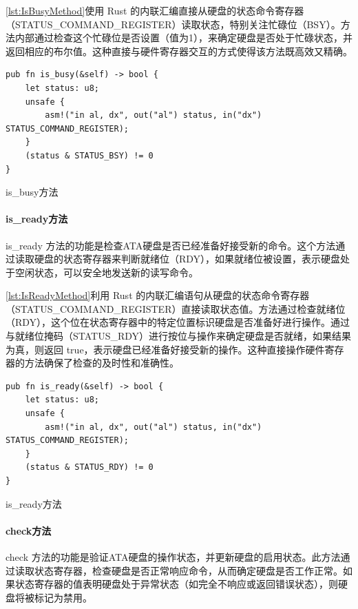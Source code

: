 \cref{lst:IsBusyMethod}使用 Rust 的内联汇编直接从硬盘的状态命令寄存器（STATUS\_COMMAND\_REGISTER）读取状态，特别关注忙碌位（BSY）。方法内部通过检查这个忙碌位是否设置（值为1），来确定硬盘是否处于忙碌状态，并返回相应的布尔值。这种直接与硬件寄存器交互的方式使得该方法既高效又精确。

\begin{listing}[htbp]
    \begin{verbatim}
pub fn is_busy(&self) -> bool {
    let status: u8;
    unsafe {
        asm!("in al, dx", out("al") status, in("dx") STATUS_COMMAND_REGISTER);
    }
    (status & STATUS_BSY) != 0
}
    \end{verbatim}
    \caption{is\_busy方法}\label{lst:IsBusyMethod}
\end{listing}

\paragraph{is\_ready方法}

is\_ready 方法的功能是检查ATA硬盘是否已经准备好接受新的命令。这个方法通过读取硬盘的状态寄存器来判断就绪位（RDY），如果就绪位被设置，表示硬盘处于空闲状态，可以安全地发送新的读写命令。

\cref{lst:IsReadyMethod}利用 Rust 的内联汇编语句从硬盘的状态命令寄存器（STATUS\_COMMAND\_REGISTER）直接读取状态值。方法通过检查就绪位（RDY），这个位在状态寄存器中的特定位置标识硬盘是否准备好进行操作。通过与就绪位掩码（STATUS\_RDY）进行按位与操作来确定硬盘是否就绪，如果结果为真，则返回 true，表示硬盘已经准备好接受新的操作。这种直接操作硬件寄存器的方法确保了检查的及时性和准确性。

\begin{listing}[htbp]
    \begin{verbatim}
pub fn is_ready(&self) -> bool {
    let status: u8;
    unsafe {
        asm!("in al, dx", out("al") status, in("dx") STATUS_COMMAND_REGISTER);
    }
    (status & STATUS_RDY) != 0
}
    \end{verbatim}
    \caption{is\_ready方法}\label{lst:IsReadyMethod}
\end{listing}

\paragraph{check方法}

check 方法的功能是验证ATA硬盘的操作状态，并更新硬盘的启用状态。此方法通过读取状态寄存器，检查硬盘是否正常响应命令，从而确定硬盘是否工作正常。如果状态寄存器的值表明硬盘处于异常状态（如完全不响应或返回错误状态），则硬盘将被标记为禁用。

